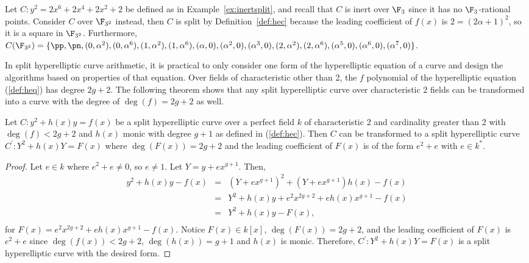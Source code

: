 Let $C : y^2 = 2x^6 + 2x^4 + 2x^2 + 2$ be defined as in
Example~\ref{ex:inertsplit}, and recall that $C$ is inert over $\F_{3}$ since it
has no $\F_{3}$-rational points. Consider $C$ over $\F_{3^2}$ instead, then $C$
is split by Definition~\ref{def:hec} because the leading coefficient of $f(x)$
is $2 = (2\alpha + 1)^2$, so it is a square in $\F_{3^2}$. Furthermore,
$C(\F_{3^2}) = \{\pp, \pn, (0,\alpha^2), (0,\alpha^6), (1,\alpha^2),
(1,\alpha^6), (\alpha,0), (\alpha^2,0), (\alpha^3,0),\\ (2,\alpha^2),
(2,\alpha^6), (\alpha^5,0), (\alpha^6,0), (\alpha^7,0) \}$.
\ee

In split hyperelliptic curve arithmetic, it is practical to only consider one
form of the hyperelliptic equation of a curve and design the algorithms based on
properties of that equation. Over fields of characteristic other than 2, the
$f$ polynomial of the hyperelliptic equation (\ref{def:heq}) has degree $2g +
2$. The following theorem shows that any split hyperelliptic curve over
characteristic 2 fields can be transformed into a curve with the degree of
$\deg(f) = 2g +2$ as well. 

\bt
Let $C : y^2 + h(x)y = f(x)$ be a split hyperelliptic curve over a perfect field
$k$ of characteristic 2 and cardinality greater than 2 with $\deg(f) < 2g + 2$
and $h(x)$ monic with degree $g + 1$ as defined in (\ref{def:hec}). Then $C$ can
be transformed to a split hyperelliptic curve $C^{\prime} : Y^2 + h(x)Y = F(x)$
where $\deg(F(x)) = 2g + 2$ and the leading coefficient of $F(x)$ is of the form
$e^2 + e$ with $e \in k^*.$
\begin{proof}
  Let $e \in k$ where $e^2 + e \neq 0$, so $e \neq 1$. Let $Y = y +
  ex^{g+1}$. Then, \begin{eqnarray*}
    y^2 + h(x)y - f(x) &=& (Y + ex^{g+1})^2 + (Y + ex^{g+1})h(x) - f(x)\\
                       &=& Y^2 + h(x)y + e^2x^{2g + 2} + eh(x)x^{g+1} - f(x)\\
                       &=& Y^2 + h(x)y - F(x),\\
  \end{eqnarray*}
for $F(x) =  e^2x^{2g + 2} + eh(x)x^{g+1} - f(x)$. Notice $F(x) \in
k[x]$, $\deg(F(x)) = 2g + 2$, and the leading coefficient of $F(x)$ is
$e^2 + e$ since  $\deg(f(x)) < 2g + 2$, $\deg(h(x)) = g + 1$ and $h(x)$ is
monic. Therefore, $C^{\prime} : Y^2 + h(x)Y = F(x)$ is a split hyperelliptic
curve with the desired form.
\end{proof}
\et

